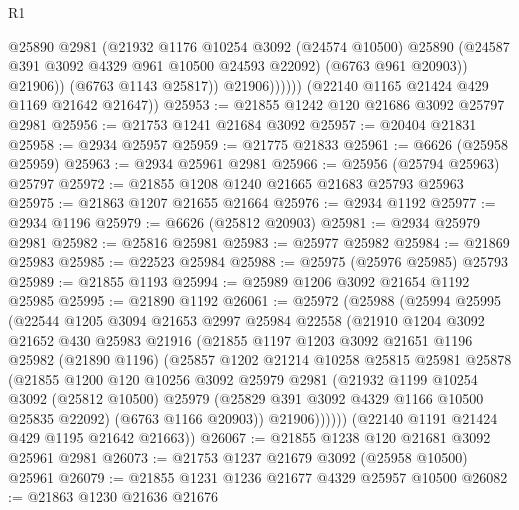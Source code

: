 \begin{lexlean}{R1}
\begin{coremodule}
                        @25890
                        @2981
                        (@21932
                          @1176
                          @10254
                          @3092
                          (@24574 @10500)
                          @25890
                          (@24587 @391 @3092 @4329 @961 @10500 @24593 @22092)
                          (@6763 @961 @20903))
                        @21906))
                    (@6763 @1143 @25817))
                  @21906))))))
      (@22140 @1165 @21424 @429 @1169 @21642 @21647))
@25953 := @21855 @1242 @120 @21686 @3092 @25797 @2981
@25956 := @21753 @1241 @21684 @3092
@25957 := @20404 @21831
@25958 := @2934 @25957
@25959 := @21775 @21833
@25961 := @6626 (@25958 @25959)
@25963 := @2934 @25961 @2981
@25966 := @25956 (@25794 @25963) @25797
@25972 := @21855 @1208 @1240 @21665 @21683 @25793 @25963
@25975 := @21863 @1207 @21655 @21664
@25976 := @2934 @1192
@25977 := @2934 @1196
@25979 := @6626 (@25812 @20903)
@25981 := @2934 @25979 @2981
@25982 := @25816 @25981
@25983 := @25977 @25982
@25984 := @21869 @25983
@25985 := @22523 @25984
@25988 := @25975 (@25976 @25985) @25793
@25989 := @21855 @1193
@25994 := @25989 @1206 @3092 @21654 @1192 @25985
@25995 := @21890 @1192
@26061 := @25972
    (@25988
      (@25994
        @25995
        (@22544
          @1205
          @3094
          @21653
          @2997
          @25984
          @22558
          (@21910
            @1204
            @3092
            @21652
            @430
            @25983
            @21916
            (@21855
              @1197
              @1203
              @3092
              @21651
              @1196
              @25982
              (@21890 @1196)
              (@25857
                @1202
                @21214
                @10258
                @25815
                @25981
                @25878
                (@21855
                  @1200
                  @120
                  @10256
                  @3092
                  @25979
                  @2981
                  (@21932
                    @1199
                    @10254
                    @3092
                    (@25812 @10500)
                    @25979
                    (@25829 @391 @3092 @4329 @1166 @10500 @25835 @22092)
                    (@6763 @1166 @20903))
                  @21906))))))
      (@22140 @1191 @21424 @429 @1195 @21642 @21663))
@26067 := @21855 @1238 @120 @21681 @3092 @25961 @2981
@26073 := @21753 @1237 @21679 @3092 (@25958 @10500) @25961
@26079 := @21855 @1231 @1236 @21677 @4329 @25957 @10500
@26082 := @21863 @1230 @21636 @21676

\end{coremodule}
\end{lexlean}
